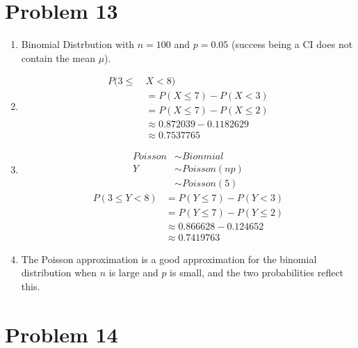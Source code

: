 \documentclass{article}
\begin{document}
\section*{Problem 13}
\begin{enumerate}[label=(\alph*)]
    \item Binomial Distrbution with \(n = 100\) and \(p = 0.05\) (success being a CI does not contain the mean \(\mu\)).
    \item \begin{align*}
              P(3 \leq\  & X < 8)                       \\
                         & = P(X \leq 7) - P(X < 3)     \\
                         & = P(X \leq 7) - P(X \leq 2)  \\
                         & \approx 0.872039 - 0.1182629 \\
                         & \approx 0.7537765
          \end{align*}
    \item \begin{align*}
              Poisson & \sim Bionmial    \\
              Y       & \sim Poisson(np) \\
                      & \sim Poisson(5)
          \end{align*}
          \begin{align*}
              P(3 \leq Y < 8) & = P(Y \leq 7) - P(Y < 3)    \\
                              & = P(Y \leq 7) - P(Y \leq 2) \\
                              & \approx 0.866628 - 0.124652 \\
                              & \approx 0.7419763
          \end{align*}
    \item The Poisson approximation is a good approximation for the binomial distribution when \(n\) is large and \(p\) is small, and the two probabilities reflect this.
\end{enumerate}
\pagebreak
\section*{Problem 14}
\end{document}
